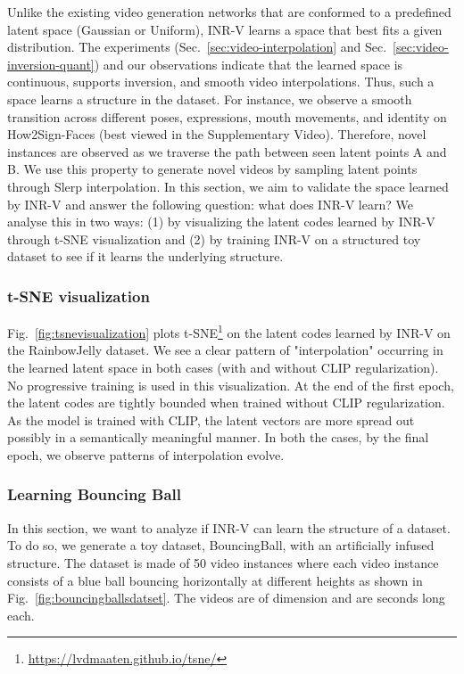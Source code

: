 \documentclass[10pt]{article} \usepackage[accepted]{tmlr}
\begin{document}
Unlike the existing video generation networks that are conformed to a predefined latent space (Gaussian or Uniform), INR-V learns a space that best fits a given distribution. The experiments (Sec.~\ref{sec:video-interpolation} and Sec.~\ref{sec:video-inversion-quant}) and our observations indicate that the learned space is continuous, supports inversion, and smooth video interpolations. Thus, such a space learns a structure in the dataset. For instance, we observe a smooth transition across different poses, expressions, mouth movements, and identity on How2Sign-Faces (best viewed in the Supplementary Video). Therefore, novel instances are observed as we traverse the path between seen latent points A and B. We use this property to generate novel videos by sampling latent points through Slerp interpolation. In this section, we aim to validate the space learned by INR-V and answer the following question: what does INR-V learn? We analyse this in two ways: (1) by visualizing the latent codes learned by INR-V through t-SNE visualization and (2) by training INR-V on a structured toy dataset to see if it learns the underlying structure.

\subsubsection{t-SNE visualization}

Fig.~\ref{fig:tsnevisualization} plots t-SNE\def\thefootnote{}\footnote{\href{https://lvdmaaten.github.io/tsne/}{https://lvdmaaten.github.io/tsne/}} on the latent codes learned by INR-V on the RainbowJelly dataset. We see a clear pattern of "interpolation" occurring in the learned latent space in both cases (with and without CLIP regularization). No progressive training is used in this visualization. At the end of the first epoch, the latent codes are tightly bounded when trained without CLIP regularization. As the model is trained with CLIP, the latent vectors are more spread out possibly in a semantically meaningful manner. In both the cases, by the final epoch, we observe patterns of interpolation evolve.

\subsubsection{Learning Bouncing Ball}

In this section, we want to analyze if INR-V can learn the structure of a dataset. To do so, we generate a toy dataset, BouncingBall, with an artificially infused structure. The dataset is made of 50 video instances where each video instance consists of a blue ball bouncing horizontally at different heights as shown in Fig.~\ref{fig:bouncingballsdatset}. The videos are of dimension  and are  seconds long each.
\end{document}
